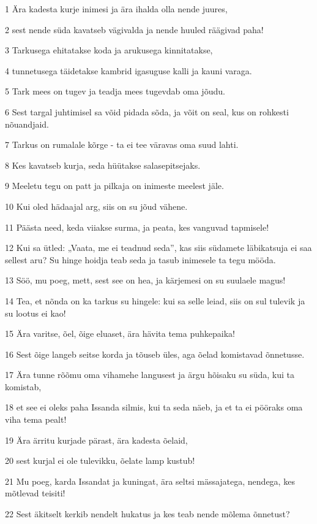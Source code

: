\par 1 Ära kadesta kurje inimesi ja ära ihalda olla nende juures,
\par 2 sest nende süda kavatseb vägivalda ja nende huuled räägivad paha!
\par 3 Tarkusega ehitatakse koda ja arukusega kinnitatakse,
\par 4 tunnetusega täidetakse kambrid igasuguse kalli ja kauni varaga.
\par 5 Tark mees on tugev ja teadja mees tugevdab oma jõudu.
\par 6 Sest targal juhtimisel sa võid pidada sõda, ja võit on seal, kus on rohkesti nõuandjaid.
\par 7 Tarkus on rumalale kõrge - ta ei tee väravas oma suud lahti.
\par 8 Kes kavatseb kurja, seda hüütakse salasepitsejaks.
\par 9 Meeletu tegu on patt ja pilkaja on inimeste meelest jäle.
\par 10 Kui oled hädaajal arg, siis on su jõud vähene.
\par 11 Päästa need, keda viiakse surma, ja peata, kes vanguvad tapmisele!
\par 12 Kui sa ütled: „Vaata, me ei teadnud seda”, kas siis südamete läbikatsuja ei saa sellest aru? Su hinge hoidja teab seda ja tasub inimesele ta tegu mööda.
\par 13 Söö, mu poeg, mett, sest see on hea, ja kärjemesi on su suulaele magus!
\par 14 Tea, et nõnda on ka tarkus su hingele: kui sa selle leiad, siis on sul tulevik ja su lootus ei kao!
\par 15 Ära varitse, õel, õige eluaset, ära hävita tema puhkepaika!
\par 16 Sest õige langeb seitse korda ja tõuseb üles, aga õelad komistavad õnnetusse.
\par 17 Ära tunne rõõmu oma vihamehe langusest ja ärgu hõisaku su süda, kui ta komistab,
\par 18 et see ei oleks paha Issanda silmis, kui ta seda näeb, ja et ta ei pööraks oma viha tema pealt!
\par 19 Ära ärritu kurjade pärast, ära kadesta õelaid,
\par 20 sest kurjal ei ole tulevikku, õelate lamp kustub!
\par 21 Mu poeg, karda Issandat ja kuningat, ära seltsi mässajatega, nendega, kes mõtlevad teisiti!
\par 22 Sest äkitselt kerkib nendelt hukatus ja kes teab nende mõlema õnnetust?
